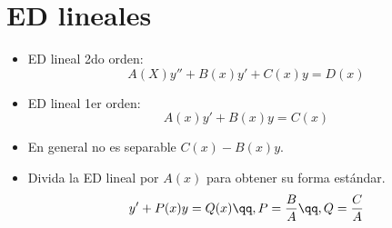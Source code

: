 \section{ED lineales}
\begin{itemize}
    \item ED lineal 2do orden: 
        \[
          A(X)y''+B(x)y'+C(x)y=D(x)
        \]
    
    \item ED lineal 1er orden:
        \[
          A(x)y'+B(x)y=C(x)
        \]
    
    \item En general no es separable $\displaystyle C(x) -B(x)y$.
    \item Divida la ED lineal por $\displaystyle A(x)$ para obtener su forma estándar.
        \[
          y'+P(x)y=Q(x)\qq, P=\frac{B}{A}\qq, Q=\frac{C}{A}
        \]
\end{itemize}


